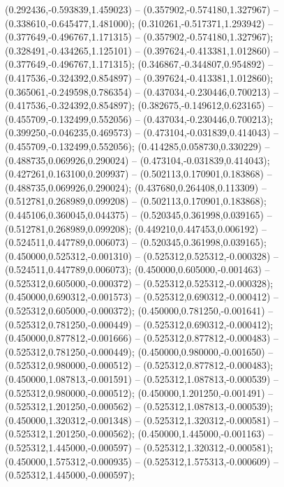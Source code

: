  (0.292436,-0.593839,1.459023) -- (0.357902,-0.574180,1.327967) -- (0.338610,-0.645477,1.481000);
 (0.310261,-0.517371,1.293942) -- (0.377649,-0.496767,1.171315) -- (0.357902,-0.574180,1.327967);
 (0.328491,-0.434265,1.125101) -- (0.397624,-0.413381,1.012860) -- (0.377649,-0.496767,1.171315);
 (0.346867,-0.344807,0.954892) -- (0.417536,-0.324392,0.854897) -- (0.397624,-0.413381,1.012860);
 (0.365061,-0.249598,0.786354) -- (0.437034,-0.230446,0.700213) -- (0.417536,-0.324392,0.854897);
 (0.382675,-0.149612,0.623165) -- (0.455709,-0.132499,0.552056) -- (0.437034,-0.230446,0.700213);
 (0.399250,-0.046235,0.469573) -- (0.473104,-0.031839,0.414043) -- (0.455709,-0.132499,0.552056);
 (0.414285,0.058730,0.330229) -- (0.488735,0.069926,0.290024) -- (0.473104,-0.031839,0.414043);
 (0.427261,0.163100,0.209937) -- (0.502113,0.170901,0.183868) -- (0.488735,0.069926,0.290024);
 (0.437680,0.264408,0.113309) -- (0.512781,0.268989,0.099208) -- (0.502113,0.170901,0.183868);
 (0.445106,0.360045,0.044375) -- (0.520345,0.361998,0.039165) -- (0.512781,0.268989,0.099208);
 (0.449210,0.447453,0.006192) -- (0.524511,0.447789,0.006073) -- (0.520345,0.361998,0.039165);
 (0.450000,0.525312,-0.001310) -- (0.525312,0.525312,-0.000328) -- (0.524511,0.447789,0.006073);
 (0.450000,0.605000,-0.001463) -- (0.525312,0.605000,-0.000372) -- (0.525312,0.525312,-0.000328);
 (0.450000,0.690312,-0.001573) -- (0.525312,0.690312,-0.000412) -- (0.525312,0.605000,-0.000372);
 (0.450000,0.781250,-0.001641) -- (0.525312,0.781250,-0.000449) -- (0.525312,0.690312,-0.000412);
 (0.450000,0.877812,-0.001666) -- (0.525312,0.877812,-0.000483) -- (0.525312,0.781250,-0.000449);
 (0.450000,0.980000,-0.001650) -- (0.525312,0.980000,-0.000512) -- (0.525312,0.877812,-0.000483);
 (0.450000,1.087813,-0.001591) -- (0.525312,1.087813,-0.000539) -- (0.525312,0.980000,-0.000512);
 (0.450000,1.201250,-0.001491) -- (0.525312,1.201250,-0.000562) -- (0.525312,1.087813,-0.000539);
 (0.450000,1.320312,-0.001348) -- (0.525312,1.320312,-0.000581) -- (0.525312,1.201250,-0.000562);
 (0.450000,1.445000,-0.001163) -- (0.525312,1.445000,-0.000597) -- (0.525312,1.320312,-0.000581);
 (0.450000,1.575312,-0.000935) -- (0.525312,1.575313,-0.000609) -- (0.525312,1.445000,-0.000597);
